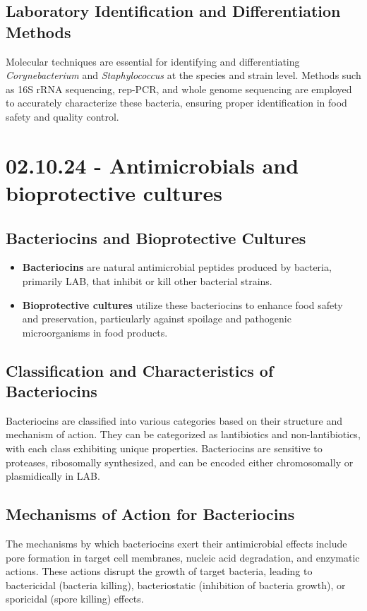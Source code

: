 \subsection{Laboratory Identification and Differentiation Methods} 
Molecular techniques are essential for identifying and differentiating \textit{Corynebacterium} and \textit{Staphylococcus} at the species and strain level. Methods such as 16S rRNA sequencing, rep-PCR, and whole genome sequencing are employed to accurately characterize these bacteria, ensuring proper identification in food safety and quality control.

\section{02.10.24 - Antimicrobials and bioprotective cultures}
\subsection{Bacteriocins and Bioprotective Cultures} 
\begin{highlight}
    \begin{itemize}
        \item \textbf{Bacteriocins} are natural antimicrobial peptides produced by bacteria, primarily LAB, that inhibit or kill other bacterial strains.
        \item \textbf{Bioprotective cultures} utilize these bacteriocins to enhance food safety and preservation, particularly against spoilage and pathogenic microorganisms in food products.
    \end{itemize}
\end{highlight}

\subsection{Classification and Characteristics of Bacteriocins} 
Bacteriocins are classified into various categories based on their structure and mechanism of action. They can be categorized as lantibiotics and non-lantibiotics, with each class exhibiting unique properties. Bacteriocins are sensitive to proteases, ribosomally synthesized, and can be encoded either chromosomally or plasmidically in LAB.

\subsection{Mechanisms of Action for Bacteriocins} 
The mechanisms by which bacteriocins exert their antimicrobial effects include pore formation in target cell membranes, nucleic acid degradation, and enzymatic actions. These actions disrupt the growth of target bacteria, leading to bactericidal (bacteria killing), bacteriostatic (inhibition of bacteria growth), or sporicidal (spore killing) effects.

